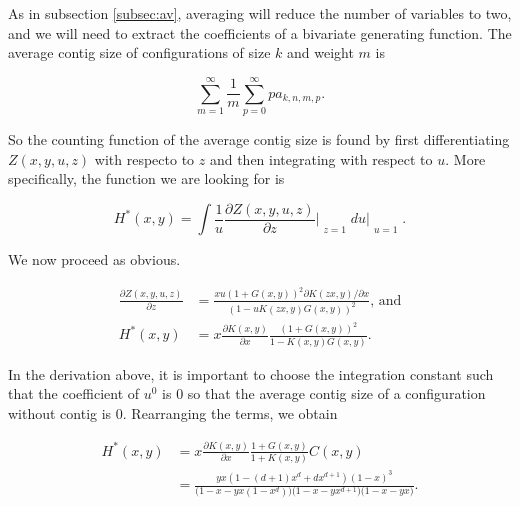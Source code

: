 \documentclass{article}
\begin{document}
As in subsection \ref{subsec:av}, averaging will reduce the number of
variables to two, and we will need to extract the coefficients of a
bivariate generating function. The average contig size of configurations
of size $k$ and weight $m$ is

\begin{equation*}
\sum_{m=1}^\infty\frac{1}{m}\sum_{p=0}^\infty pa_{k,n,m,p}.
\end{equation*}

So the counting function of the average contig size is found by first
differentiating $Z(x,y,u,z)$ with respecto to $z$ and then integrating
with respect to $u$. More specifically, the function we are looking for is

\begin{equation*}
H^*(x,y) = \int \frac{1}{u}
\frac{\partial Z(x,y,u,z)}{\partial z}\Bigr|_{\substack{\\z=1}} du
\biggr|_{\substack{\\u=1}}.
\end{equation*}

We now proceed as obvious.

\begin{equation*}
\begin{split}
\frac{\partial Z(x,y,u,z)}{\partial z} &=
\frac{xu\left(1+G(x,y)\right)^2 \partial K(zx,y)/ \partial x}
{\left(1-uK(zx,y)G(x,y)\right)^2} \text{, and} \\
H^*(x,y) &=  x \frac{\partial K(x,y)}{\partial x}
\frac{\left(1+G(x,y)\right)^2}{1-K(x,y)G(x,y)}.
\end{split}
\end{equation*}

In the derivation above, it is important to choose the integration
constant such that the coefficient of $u^0$ is $0$ so that the average
contig size of a configuration without contig is $0$. Rearranging the
terms, we obtain

\begin{equation*}
\begin{split}
H^*(x,y) &= x \frac{\partial K(x,y)}{\partial x}
\frac{1+G(x,y)}{1+K(x,y)}C(x,y) \\
&= \frac{yx(1-(d+1)x^d+dx^{d+1})(1-x)^3}
{\big(1-x-yx(1-x^d)\big)\big(1-x-yx^{d+1}\big)\big(1-x-yx\big)}.
\end{split}
\end{equation*}
\end{document}
